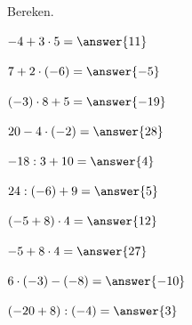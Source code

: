 \documentclass{ximera}
\begin{document}
\begin{oefening}{\oefB}

Bereken.

\begin{question} \(-4+3\cdot5=\answer{11}\) \end{question}

\begin{question} \(7+2\cdot(-6)=\answer{-5}\) \end{question}

\begin{question} \((-3)\cdot8+5=\answer{-19}\) \end{question}

\begin{question} \(20-4\cdot(-2)=\answer{28}\) \end{question}

\begin{question} \(-18:3+10=\answer{4}\) \end{question}

\begin{question} \(24:(-6)+9=\answer{5}\) \end{question}

\begin{question} \((-5+8)\cdot4=\answer{12}\) \end{question}

\begin{question} \(-5+8\cdot4=\answer{27}\) \end{question}

\begin{question} \(6\cdot(-3)-(-8)=\answer{-10}\) \end{question}

\begin{question} \((-20+8):(-4)=\answer{3}\) \end{question}

\end{oefening}


\end{document}
